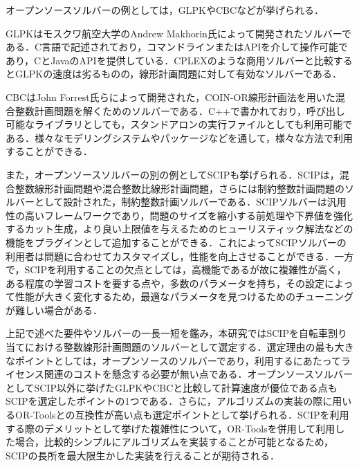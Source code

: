           \par オープンソースソルバーの例としては，GLPKやCBCなどが挙げられる．
          
          \par GLPKはモスクワ航空大学のAndrew Makhorin氏によって開発されたソルバーである．C言語で記述されており，コマンドラインまたはAPIを介して操作可能であり，CとJavaのAPIを提供している．CPLEXのような商用ソルバーと比較するとGLPKの速度は劣るものの，線形計画問題に対して有効なソルバーである．
          
          \par CBCはJohn Forrest氏らによって開発された，COIN-OR線形計画法を用いた混合整数計画問題を解くためのソルバーである．C++で書かれており，呼び出し可能なライブラリとしても，スタンドアロンの実行ファイルとしても利用可能である．様々なモデリングシステムやパッケージなどを通して，様々な方法で利用することができる．
          
          \par また，オープンソースソルバーの別の例としてSCIPも挙げられる．SCIPは，混合整数線形計画問題や混合整数比線形計画問題，さらには制約整数計画問題のソルバーとして設計された，制約整数計画ソルバーである．SCIPソルバーは汎用性の高いフレームワークであり，問題のサイズを縮小する前処理や下界値を強化するカット生成，より良い上限値を与えるためのヒューリスティック解法などの機能をプラグインとして追加することができる．これによってSCIPソルバーの利用者は問題に合わせてカスタマイズし，性能を向上させることができる．一方で，SCIPを利用することの欠点としては，高機能であるが故に複雑性が高く，ある程度の学習コストを要する点や，多数のパラメータを持ち，その設定によって性能が大きく変化するため，最適なパラメータを見つけるためのチューニングが難しい場合がある．
          
          \par 上記で述べた要件やソルバーの一長一短を鑑み，本研究ではSCIPを自転車割り当てにおける整数線形計画問題のソルバーとして選定する．選定理由の最も大きなポイントとしては，オープンソースのソルバーであり，利用するにあたってライセンス関連のコストを懸念する必要が無い点である．オープンソースソルバーとしてSCIP以外に挙げたGLPKやCBCと比較して計算速度が優位である点もSCIPを選定したポイントの1つである．さらに，アルゴリズムの実装の際に用いるOR-Toolsとの互換性が高い点も選定ポイントとして挙げられる．SCIPを利用する際のデメリットとして挙げた複雑性について，OR-Toolsを併用して利用した場合，比較的シンプルにアルゴリズムを実装することが可能となるため，SCIPの長所を最大限生かした実装を行えることが期待される．
          
